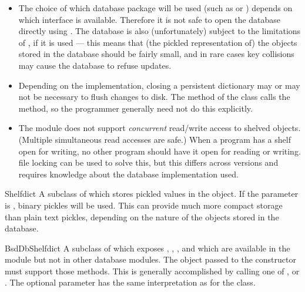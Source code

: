 \begin{itemize}

\item
The choice of which database package will be used
(such as  or ) depends on which interface
is available.  Therefore it is not safe to open the database directly
using .  The database is also (unfortunately) subject
to the limitations of , if it is used --- this means
that (the pickled representation of) the objects stored in the
database should be fairly small, and in rare cases key collisions may
cause the database to refuse updates.

\item
Depending on the implementation, closing a persistent dictionary may
or may not be necessary to flush changes to disk.  The 
method of the  class calls the  method, so the
programmer generally need not do this explicitly.

\item
The  module does not support \emph{concurrent} read/write
access to shelved objects.  (Multiple simultaneous read accesses are
safe.)  When a program has a shelf open for writing, no other program
should have it open for reading or writing.  \UNIX{} file locking can
be used to solve this, but this differs across \UNIX{} versions and
requires knowledge about the database implementation used.

\end{itemize}

\begin{classdesc}{Shelf}{dict}
A subclass of  which stores pickled values in the
 object.  If the  parameter is , binary
pickles will be used.  This can provide much more compact storage than plain
text pickles, depending on the nature of the objects stored in the database.
\end{classdesc}

\begin{classdesc}{BsdDbShelf}{dict}
A subclass of  which exposes , ,
,  and  which are
available in the  module but not in other database modules.
The  object passed to the constructor must support those methods.
This is generally accomplished by calling one of ,
 or .  The optional
 parameter has the same interpretation as for the 
class. 
\end{classdesc}

